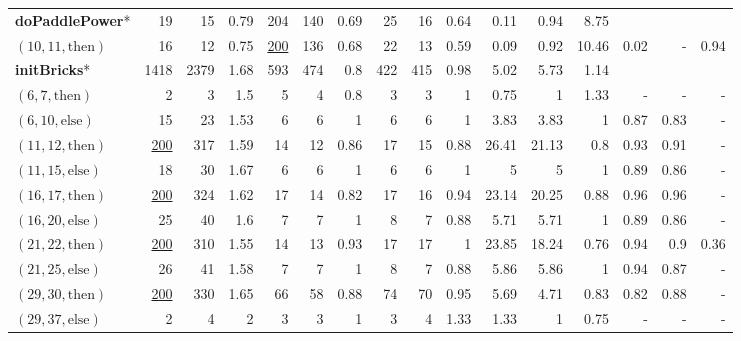\documentclass[sigconf,review, anonymous]{acmart}
\newcommand{\thenBr}{\text{then}}
\newcommand{\elseBr}{\text{else}}
\newcommand{\un}[1]{\underline{#1}}
\begin{document}
\begin{table}[!t]
\begin{tabular}{l|rrr|rrr|rrr|rrr|rrr}
    \hline
   \textbf{doPaddlePower}*   & 19       & 15   & 0.79      & 204  & 140 & 0.69          & 25 & 16  & 0.64              & 0.11   & 0.94 & 8.75   &       &      &      \\
    $(10,11,\thenBr)$        & 16       & 12   & 0.75      & \un{200} & 136 & 0.68      & 22 & 13  & 0.59              & 0.09   & 0.92 & 10.46  &  0.02 & - & 0.94 \\
    \hline
   \textbf{initBricks}*      & 1418     & 2379 & 1.68      & 593  & 474 & 0.8           & 422 & 415 & 0.98             & 5.02   & 5.73  & 1.14   &      &      &       \\
    $(6,7,\thenBr)$          & 2        & 3    & 1.5       & 5    & 4   & 0.8           & 3   & 3   & 1                & 0.75   & 1     & 1.33   & - & -  & -   \\
    $(6,10,\elseBr)$         & 15       & 23   & 1.53      & 6    & 6   & 1             & 6   & 6   & 1                & 3.83   & 3.83  & 1      & 0.87 & 0.83 & -   \\
    $(11,12,\thenBr)$        & \un{200} & 317  & 1.59      & 14   & 12  & 0.86          & 17  & 15  & 0.88             & 26.41  & 21.13 & 0.8    & 0.93 & 0.91 & -  \\
    $(11,15,\elseBr)$        & 18       & 30   & 1.67      & 6    & 6   & 1             & 6   & 6   & 1                & 5      & 5     & 1      & 0.89 & 0.86 & -  \\
    $(16,17,\thenBr)$        & \un{200} & 324  & 1.62      & 17   & 14  & 0.82          & 17  & 16  & 0.94             & 23.14  & 20.25 & 0.88   & 0.96 & 0.96 & -  \\
    $(16,20,\elseBr)$        & 25       & 40   & 1.6       & 7    & 7   & 1             & 8   & 7   & 0.88             & 5.71   & 5.71  & 1      & 0.89 & 0.86 & -  \\
    $(21,22,\thenBr)$        & \un{200} & 310  & 1.55      & 14   & 13  & 0.93          & 17  & 17  & 1                & 23.85  & 18.24 & 0.76   & 0.94 & 0.9  & 0.36  \\
    $(21,25,\elseBr)$        & 26       & 41   & 1.58      & 7    & 7   & 1             & 8   & 7   & 0.88             & 5.86   & 5.86  & 1      & 0.94 & 0.87 & -  \\
    $(29,30,\thenBr)$        & \un{200} & 330  & 1.65      & 66   & 58  & 0.88          & 74  & 70  & 0.95             & 5.69   & 4.71  & 0.83   & 0.82 & 0.88 & -   \\
    $(29,37,\elseBr)$        & 2        & 4    & 2         & 3    & 3   & 1             & 3   & 4   & 1.33             & 1.33   & 1     & 0.75   & - & - & -  \\

\end{tabular}
\end{table}
\end{document}
